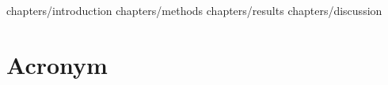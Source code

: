 \documentclass[a4paper, 12pt, twoside]{report}
\numberwithin{equation}{section}
\begin{document}
 {chapters/introduction}
 {chapters/methods}
 {chapters/results}
 {chapters/discussion}


\appendix{}
%


\chapter {Acronym}
\printglossary[type=\acronymtype]

\chapter {\listfigurename}
\listoffigures{}

\chapter {\listtablename}
\listoftables{}





%

\nocite{*}
\cleardoublepage{}


\erklaerung{}
\end{document}
